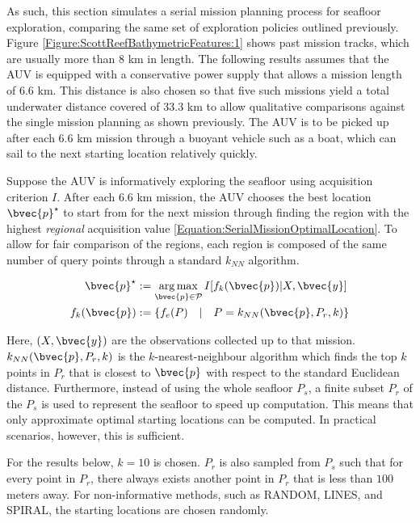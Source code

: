 			As such, this section simulates a serial mission planning process for seafloor exploration, comparing the same set of exploration policies outlined previously. Figure \ref{Figure:ScottReefBathymetricFeatures:1} shows past mission tracks, which are usually more than 8 km in length. The following results assumes that the AUV is equipped with a conservative power supply that allows a mission length of 6.6 km. This distance is also chosen so that five such missions yield a total underwater distance covered of 33.3 km to allow qualitative comparisons against the single mission planning as shown previously. The AUV is to be picked up after each 6.6 km mission through a buoyant vehicle such as a boat, which can sail to the next starting location relatively quickly.
			
			Suppose the AUV is informatively exploring the seafloor using acquisition criterion $I$. After each 6.6 km mission, the AUV chooses the best location $\bvec{p}^{\star}$ to start from for the next mission through finding the region with the highest \textit{regional} acquisition value \eqref{Equation:SerialMissionOptimalLocation}. To allow for fair comparison of the regions, each region is composed of the same number of query points through a standard $k_{NN}$ algorithm.
			
			\begin{equation}
				\begin{aligned}
					\bvec{p}^{\star} &:= \argmax_{\bvec{p} \in \mathcal{P}} I[f_{k}(\bvec{p}) | X, \bvec{y}] \\
					f_{k}(\bvec{p}) &:= \{f_{e}(P) \quad | \quad P = k_{NN}(\bvec{p}, P_{r}, k) \}
				\end{aligned}
			\label{Equation:SerialMissionOptimalLocation}
			\end{equation}
			
			Here, $(X, \bvec{y})$ are the observations collected up to that mission. $k_{NN}(\bvec{p}, P_{r}, k)$ is the $k$-nearest-neighbour algorithm which finds the top $k$ points in $P_{r}$ that is closest to $\bvec{p}$ with respect to the standard Euclidean distance. Furthermore, instead of using the whole seafloor $P_{s}$, a finite subset $P_{r}$ of the $P_{s}$ is used to represent the seafloor to speed up computation. This means that only approximate optimal starting locations can be computed. In practical scenarios, however, this is sufficient.
			
			For the results below, $k = 10$ is chosen. $P_{r}$ is also sampled from $P_{s}$ such that for every point in $P_{r}$, there always exists another point in $P_{r}$ that is less than $100$ meters away. For non-informative methods, such as RANDOM, LINES, and SPIRAL, the starting locations are chosen randomly. 
			
